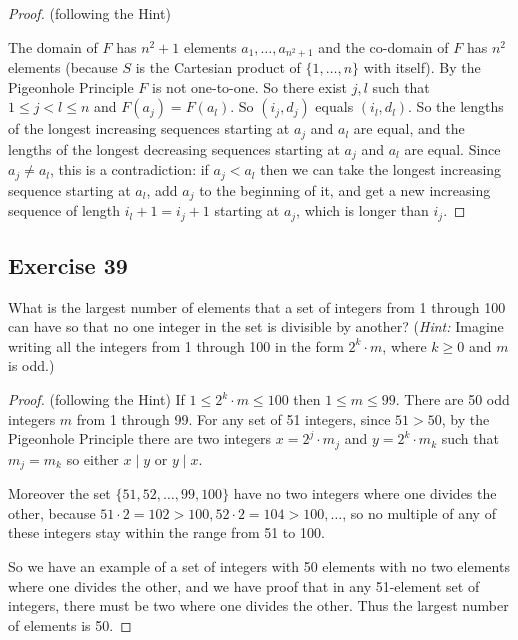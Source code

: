 \documentclass[14pt]{extarticle}
\begin{document}
\begin{proof}
(following the Hint)

The domain of \(F\) has \(n^2+1\) elements \(a_1, \ldots, a_{n^2+1}\) and the co-domain of \(F\) has \(n^2\) elements
(because \(S\) is the Cartesian product of \(\{1, \ldots, n\}\) with itself). By the Pigeonhole Principle \(F\) is 
not one-to-one. So there exist \(j,l\) such that \(1 \leq j < l \leq n\) and \(F(a_j) = F(a_l)\). So \((i_j, d_j)\) 
equals \((i_l, d_l)\). So the lengths of the longest increasing sequences starting at \(a_j\) and \(a_l\) are 
equal, and the lengths of the longest decreasing sequences starting at \(a_j\) and \(a_l\) are equal. Since \(a_j \neq 
a_l\), this is a contradiction: if \(a_j < a_l\) then we can take the longest increasing sequence starting at 
\(a_l\), add \(a_j\) to the beginning of it, and get a new increasing sequence of length \(i_l + 1 = i_j + 1\) 
starting at \(a_j\), which is longer than \(i_j\).
\end{proof}

\subsection{Exercise 39}
What is the largest number of elements that a set of integers from 1 through 100 can have so that no one integer 
in the set is divisible by another? ({\it Hint:} Imagine writing all the integers from 1 through 100 in the form 
\(2^k \cdot m\), where \(k \geq 0\) and \(m\) is odd.)

\begin{proof}
(following the Hint) If \(1 \leq 2^k \cdot m \leq 100\) then \(1 \leq m \leq 99\). There are 50 odd integers \(m\)
from 1 through 99. For any set of 51 integers, since \(51 > 50\), by the Pigeonhole Principle there are two integers 
\(x = 2^j \cdot m_j\) and \(y = 2^k \cdot m_k\) such that \(m_j = m_k\) so either \(x \mid y\) or \(y \mid x\).

Moreover the set \(\{51, 52, \ldots, 99, 100\}\) have no two integers where one divides the other, because 
\(51 \cdot 2 = 102 > 100, 52 \cdot 2 = 104 > 100, \ldots\), so no multiple of any of these integers stay within the 
range from 51 to 100.

So we have an example of a set of integers with 50 elements with no two elements where one divides the other, and we 
have proof that in any 51-element set of integers, there must be two where one divides the other. Thus the largest
number of elements is 50.
\end{proof}
\end{document}
